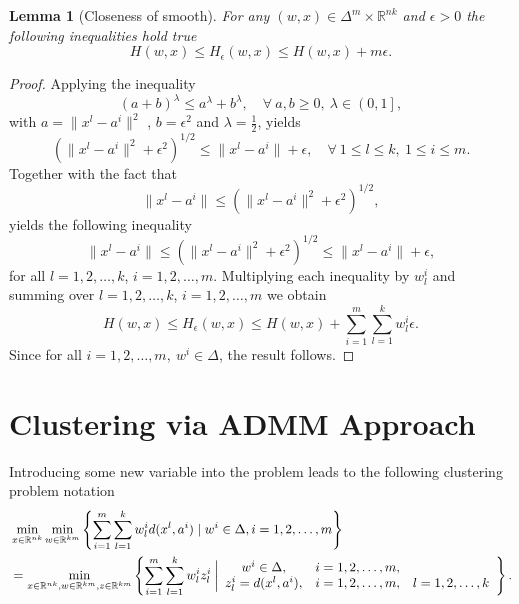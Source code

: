 \documentclass[11pt]{article}
\numberwithin{equation}{section}
\newtheorem{lemma}{Lemma}[proposition]
\begin{document}
\begin{lemma}[Closeness of smooth]
For any $(w,x) \in {\Delta}^m \times \mathbb{R}^{nk}$ and $\epsilon > 0$ the following inequalities hold true
\begin{equation*}
	H(w,x) \leq H_{\epsilon}(w,x) \leq H(w,x) + m\epsilon .
\end{equation*}
\end{lemma}

\begin{proof}
Applying the inequality
\begin{equation*}
	\left( a+b \right)^{\lambda} \leq a^{\lambda} + b^{\lambda}, \quad \forall \: a,b \geq 0, \: \lambda \in \left( 0,1 \right] ,
\end{equation*}
with $a = \|x^l - a^i \|^2$ , $b = {\epsilon}^2$ and $\lambda = \frac{1}{2}$, yields
\begin{equation*}
	\left(\|x^l - a^i \|^2 + {\epsilon}^2 \right)^{1/2} \leq \|x^l - a^i \| + \epsilon , \quad \forall \: 1 \leq l \leq k, \: 1 \leq i \leq m .
\end{equation*}
Together with the fact that
\begin{equation*}
	\|x^l - a^i \| \leq \left(\|x^l - a^i \|^2 + {\epsilon}^2 \right)^{1/2},
\end{equation*}
yields the following inequality
\begin{equation*}
	\|x^l - a^i \| \leq \left(\|x^l - a^i \|^2 + {\epsilon}^2 \right)^{1/2} \leq \|x^l - a^i \| + \epsilon ,
\end{equation*}
for all $l=1,2, \ldots, k$, $i=1,2, \ldots, m$.
Multiplying each inequality by $w^i_l$ and summing over $l=1,2, \ldots, k$, $i=1,2, \ldots, m$ we obtain
\begin{equation*}
	H(w,x) \leq H_{\epsilon}(w,x) \leq H(w,x) + \sum\limits_{i=1}^m \sum\limits_{l=1}^k w^i_l \epsilon .
\end{equation*}
Since for all $i=1,2, \dots, m, \: w^i \in \Delta$, the result follows.
\end{proof}

\newpage

\section{Clustering via ADMM Approach}
Introducing some new variable into the problem leads to the following clustering problem notation
\begin{equation*}
\begin{split}
	&\min\limits_{x \in \mathbb{R}^{nk}} \min\limits_{w \in \mathbb{R}^{km}} \left\lbrace \sum\limits_{i=1}^{m} \sum\limits_{l=1}^{k} w^i_l d(x^l,a^i) \mid w^i \in \Delta, i=1,2, \ldots, m \right\rbrace \\
	&= \min\limits_{x \in \mathbb{R}^{nk}, w \in \mathbb{R}^{km}, z \in \mathbb{R}^{km}} \left\lbrace \sum\limits_{i=1}^{m} \sum\limits_{l=1}^{k} w^i_l z^i_l \: \bigg| 
\begin{array}{c c c}
 w^i \in \Delta, & i=1,2, \ldots, m, & \\
 z^i_l = d(x^l,a^i), & i=1,2, \ldots, m, & l=1,2, \ldots, k
\end{array}
\right\rbrace .
\end{split}
\end{equation*}
\end{document}
